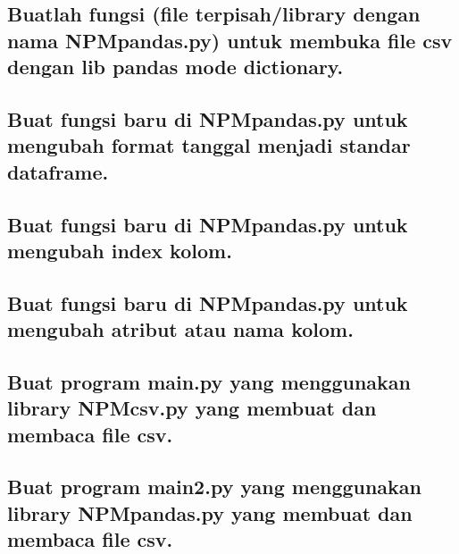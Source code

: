 \subsection{Buatlah fungsi (file terpisah/library dengan nama NPMpandas.py) untuk membuka file csv dengan lib pandas mode dictionary.}


\subsection{Buat fungsi baru di NPMpandas.py untuk mengubah format tanggal menjadi standar dataframe.}


\subsection{Buat fungsi baru di NPMpandas.py untuk mengubah index kolom.}


\subsection{Buat fungsi baru di NPMpandas.py untuk mengubah atribut atau nama kolom.}


\subsection{Buat program main.py yang menggunakan library NPMcsv.py yang membuat dan membaca file csv.}


\subsection{Buat program main2.py yang menggunakan library NPMpandas.py yang membuat dan membaca file csv.}


